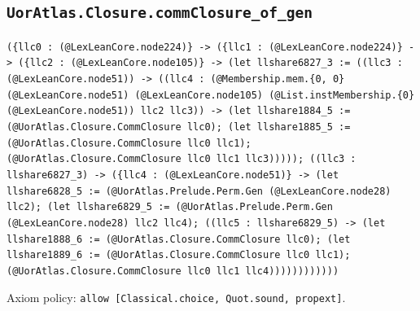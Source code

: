\documentclass[11pt]{article}
\begin{document}
\subsection*{\texttt{UorAtlas.Closure.commClosure\_of\_gen}}
\noindent\texttt{(\{llc0 : (@LexLeanCore.node224)\} -> (\{llc1 : (@LexLeanCore.node224)\} -> (\{llc2 : (@LexLeanCore.node105)\} -> (let llshare6827\_3 := ((llc3 : (@LexLeanCore.node51)) -> ((llc4 : (@Membership.mem.\{0, 0\} (@LexLeanCore.node51) (@LexLeanCore.node105) (@List.instMembership.\{0\} (@LexLeanCore.node51)) llc2 llc3)) -> (let llshare1884\_5 := (@UorAtlas.Closure.CommClosure llc0); (let llshare1885\_5 := (@UorAtlas.Closure.CommClosure llc0 llc1); (@UorAtlas.Closure.CommClosure llc0 llc1 llc3))))); ((llc3 : llshare6827\_3) -> (\{llc4 : (@LexLeanCore.node51)\} -> (let llshare6828\_5 := (@UorAtlas.Prelude.Perm.Gen (@LexLeanCore.node28) llc2); (let llshare6829\_5 := (@UorAtlas.Prelude.Perm.Gen (@LexLeanCore.node28) llc2 llc4); ((llc5 : llshare6829\_5) -> (let llshare1888\_6 := (@UorAtlas.Closure.CommClosure llc0); (let llshare1889\_6 := (@UorAtlas.Closure.CommClosure llc0 llc1); (@UorAtlas.Closure.CommClosure llc0 llc1 llc4))))))))))))}\par
\noindent Axiom policy: \texttt{allow [Classical.choice, Quot.sound, propext]}.\par
\end{document}
